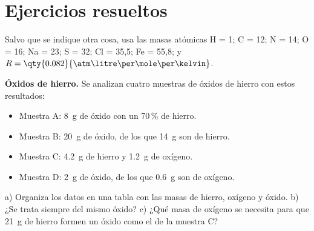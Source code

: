 
\section{Ejercicios resueltos}\label{sec:ud1-resueltos}

Salvo que se indique otra cosa, usa las masas atómicas H = 1; C = 12; N = 14; O = 16; Na = 23; S = 32; Cl = 35,5;
Fe = 55,8; y \(R = \qty{0.082}{\atm\litre\per\mole\per\kelvin}\).

\begin{example}
    \textbf{Óxidos de hierro.} Se analizan cuatro muestras de óxidos de hierro con estos resultados:
    \begin{itemize}
        \item Muestra A: \qty{8}{\gram} de óxido con un 70\,\% de hierro.
        \item Muestra B: \qty{20}{\gram} de óxido, de los que \qty{14}{\gram} son de hierro.
        \item Muestra C: \qty{4.2}{\gram} de hierro y \qty{1.2}{\gram} de oxígeno.
        \item Muestra D: \qty{2}{\gram} de óxido, de los que \qty{0.6}{\gram} son de oxígeno.
    \end{itemize}
    a) Organiza los datos en una tabla con las masas de hierro, oxígeno y óxido. b) ¿Se trata siempre del mismo óxido?
    c) ¿Qué masa de oxígeno se necesita para que \qty{21}{\gram} de hierro formen un óxido como el de la muestra C?


\end{example}
